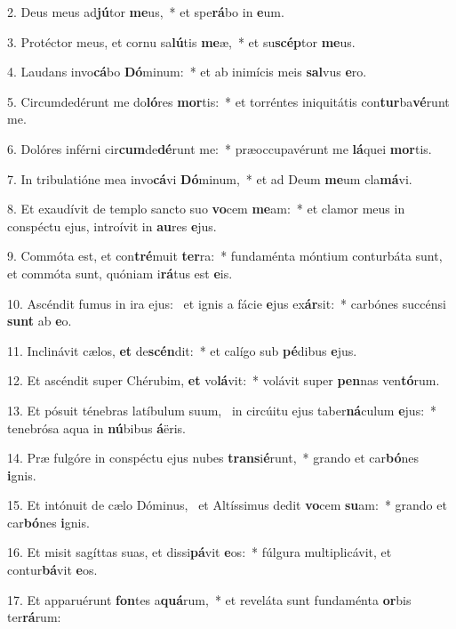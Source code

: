 2. Deus meus ad\textbf{jú}tor \textbf{me}us,~*  et spe\textbf{rá}bo in \textbf{e}um.\

3. Protéctor meus, et cornu sa\textbf{lú}tis \textbf{me}æ,~*  et su\textbf{scép}tor \textbf{me}us.\

4. Laudans invo\textbf{cá}bo \textbf{Dó}minum:~*  et ab inimícis meis \textbf{sal}vus \textbf{e}ro.\

5. Circumdedérunt me do\textbf{ló}res \textbf{mor}tis:~*  et torréntes iniquitátis con\textbf{tur}ba\textbf{vé}runt me.\

6. Dolóres inférni cir\textbf{cum}de\textbf{dé}runt me:~*  præoccupavérunt me \textbf{lá}quei \textbf{mor}tis.\

7. In tribulatióne mea invo\textbf{cá}vi \textbf{Dó}minum,~*  et ad Deum \textbf{me}um cla\textbf{má}vi.\

8. Et exaudívit de templo sancto suo \textbf{vo}cem \textbf{me}am:~*  et clamor meus in conspéctu ejus, introívit in \textbf{au}res \textbf{e}jus.\

9. Commóta est, et con\textbf{tré}muit \textbf{ter}ra:~*  fundaménta móntium conturbáta sunt, et commóta sunt, quóniam i\textbf{rá}tus est \textbf{e}is.\

10. Ascéndit fumus in ira ejus: \dag\  et ignis a fácie \textbf{e}jus ex\textbf{ár}sit:~*  carbónes succénsi \textbf{sunt} ab \textbf{e}o.\

11. Inclinávit cælos, \textbf{et} de\textbf{scén}dit:~*  et calígo sub \textbf{pé}dibus \textbf{e}jus.\

12. Et ascéndit super Chérubim, \textbf{et} vo\textbf{lá}vit:~*  volávit super \textbf{pen}nas ven\textbf{tó}rum.\

13. Et pósuit ténebras latíbulum suum, \dag\  in circúitu ejus taber\textbf{ná}culum \textbf{e}jus:~*  tenebrósa aqua in \textbf{nú}bibus \textbf{á}ëris.\

14. Præ fulgóre in conspéctu ejus nubes \textbf{trans}i\textbf{é}runt,~*  grando et car\textbf{bó}nes \textbf{i}gnis.\

15. Et intónuit de cælo Dóminus, \dag\  et Altíssimus dedit \textbf{vo}cem \textbf{su}am:~*  grando et car\textbf{bó}nes \textbf{i}gnis.\

16. Et misit sagíttas suas, et dissi\textbf{pá}vit \textbf{e}os:~*  fúlgura multiplicávit, et contur\textbf{bá}vit \textbf{e}os.\

17. Et apparuérunt \textbf{fon}tes a\textbf{quá}rum,~*  et reveláta sunt fundaménta \textbf{or}bis ter\textbf{rá}rum:\

